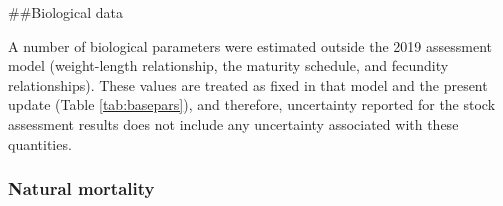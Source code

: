 \documentclass[11pt,
  english,
  a4paper,
]{article}
\begin{document}
\leavevmode\tagmcend\tagstructend\par


\#\#Biological data

\leavevmode\tagmcend\tagstructend\par


A number of biological parameters were estimated outside the 2019 assessment model (weight-length relationship, the maturity schedule, and fecundity relationships). These values are treated as fixed in that model and the present update (Table \ref{tab:basepars}), and therefore, uncertainty reported for the stock assessment results does not include any uncertainty associated with these quantities.

\leavevmode\tagmcend\tagstructend\par


\hypertarget{natural-mortality}{%
\subsubsection{Natural mortality}\label{natural-mortality}}

\leavevmode\tagmcend\tagstructend

\end{document}

